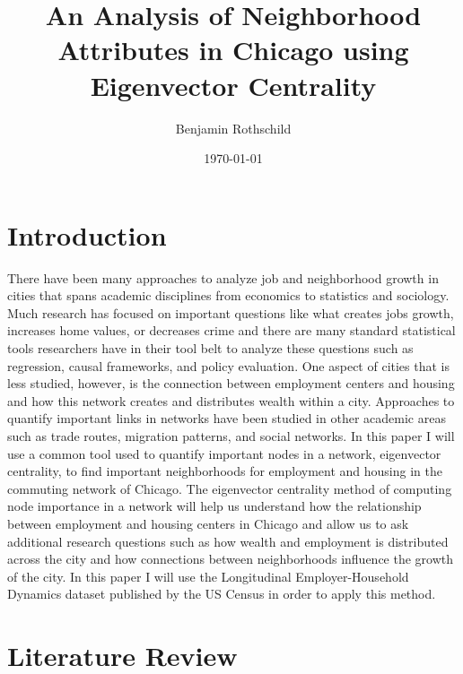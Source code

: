 \documentclass{article}
\title{An Analysis of Neighborhood Attributes in Chicago using Eigenvector Centrality}
\author{Benjamin Rothschild}
\date{\today}
\theoremstyle{definition}
\theoremstyle{remark}
\begin{document}
\begin{titlepage}
\maketitle
\thispagestyle{empty}

\end{titlepage}

\section{Introduction}
 
There have been many approaches to analyze job and neighborhood growth in cities that spans academic disciplines from economics to statistics and sociology.  Much research has focused on important questions like what creates jobs growth, increases home values, or decreases crime and there are many standard statistical tools researchers have in their tool belt to analyze these questions such as regression, causal frameworks, and policy evaluation.  One aspect of cities that is less studied, however, is the connection between employment centers and housing and how this network creates and distributes wealth within a city.  Approaches to quantify important links in networks have been studied in other academic areas such as trade routes, migration patterns, and social networks.  In this paper I will use a common tool used to quantify important nodes in a network, eigenvector centrality, to find important neighborhoods for employment and housing in the commuting network of Chicago.  The eigenvector centrality method of computing node importance in a network will help us understand how the relationship between employment and housing centers in Chicago and allow us to ask additional research questions such as how wealth and employment is distributed across the city and how connections between neighborhoods influence the growth of the city.  In this paper I will use the Longitudinal Employer-Household Dynamics dataset published by the US Census in order to apply this method.

\section{Literature Review}
\end{document}
